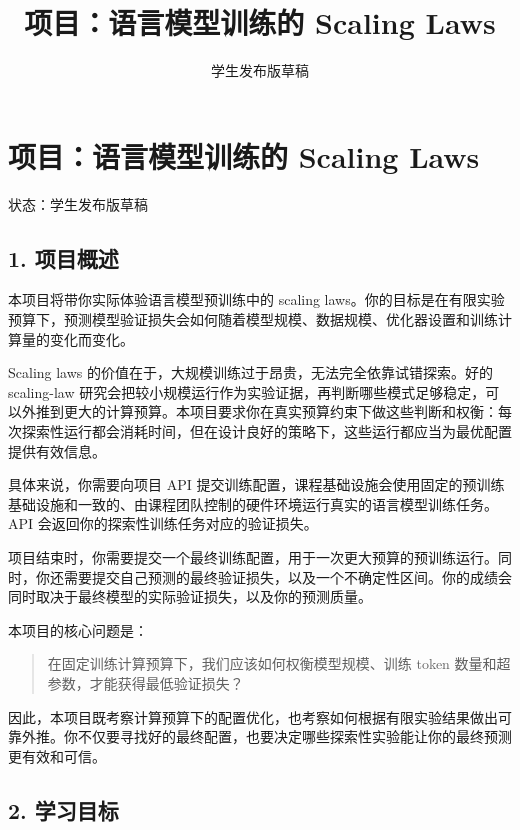 \documentclass[
  11pt,
]{ctexart}
\title{项目：语言模型训练的 Scaling Laws}
\author{}
\date{学生发布版草稿}
\begin{document}
\maketitle

{
\hypersetup{linkcolor=}
\setcounter{tocdepth}{3}
\tableofcontents
}
\hypertarget{ux9879ux76eeux8bedux8a00ux6a21ux578bux8badux7ec3ux7684-scaling-laws}{%
\section{项目：语言模型训练的 Scaling
Laws}\label{ux9879ux76eeux8bedux8a00ux6a21ux578bux8badux7ec3ux7684-scaling-laws}}

状态：学生发布版草稿

\hypertarget{ux9879ux76eeux6982ux8ff0}{%
\subsection{1. 项目概述}\label{ux9879ux76eeux6982ux8ff0}}

本项目将带你实际体验语言模型预训练中的 scaling
laws。你的目标是在有限实验预算下，预测模型验证损失会如何随着模型规模、数据规模、优化器设置和训练计算量的变化而变化。

Scaling laws 的价值在于，大规模训练过于昂贵，无法完全依靠试错探索。好的
scaling-law
研究会把较小规模运行作为实验证据，再判断哪些模式足够稳定，可以外推到更大的计算预算。本项目要求你在真实预算约束下做这些判断和权衡：每次探索性运行都会消耗时间，但在设计良好的策略下，这些运行都应当为最优配置提供有效信息。

具体来说，你需要向项目 API
提交训练配置，课程基础设施会使用固定的预训练基础设施和一致的、由课程团队控制的硬件环境运行真实的语言模型训练任务。API
会返回你的探索性训练任务对应的验证损失。

项目结束时，你需要提交一个最终训练配置，用于一次更大预算的预训练运行。同时，你还需要提交自己预测的最终验证损失，以及一个不确定性区间。你的成绩会同时取决于最终模型的实际验证损失，以及你的预测质量。

本项目的核心问题是：

\begin{quote}
在固定训练计算预算下，我们应该如何权衡模型规模、训练 token
数量和超参数，才能获得最低验证损失？
\end{quote}

因此，本项目既考察计算预算下的配置优化，也考察如何根据有限实验结果做出可靠外推。你不仅要寻找好的最终配置，也要决定哪些探索性实验能让你的最终预测更有效和可信。

\hypertarget{ux5b66ux4e60ux76eeux6807}{%
\subsection{2. 学习目标}\label{ux5b66ux4e60ux76eeux6807}}
\end{document}
